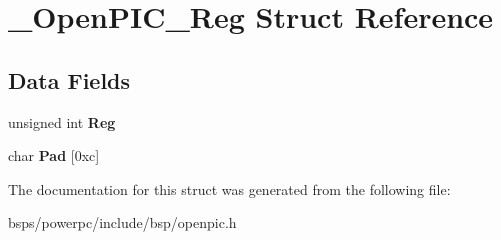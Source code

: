 \hypertarget{struct__OpenPIC__Reg}{}\section{\+\_\+\+Open\+P\+I\+C\+\_\+\+Reg Struct Reference}
\label{struct__OpenPIC__Reg}
\subsection*{Data Fields}
\begin{DoxyCompactItemize}
\item 
\mbox{\label{struct__OpenPIC__Reg_abb6405ba756086b5ec6e582a3215d5f2}} 
unsigned int {\bfseries Reg}
\item 
\mbox{\label{struct__OpenPIC__Reg_a001e43882f1e80fd54ddbabaf76fafa9}} 
char {\bfseries Pad} \mbox{[}0xc\mbox{]}
\end{DoxyCompactItemize}


The documentation for this struct was generated from the following file\+:\begin{DoxyCompactItemize}
\item 
bsps/powerpc/include/bsp/openpic.\+h\end{DoxyCompactItemize}
